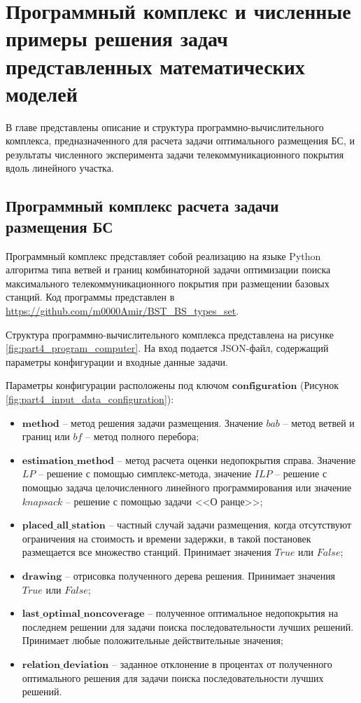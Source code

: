 \chapter{Программный комплекс и численные примеры решения задач представленных математических моделей}\label{part4}

В главе представлены описание и структура программно-вычислительного комплекса, предназначенного для расчета задачи оптимального размещения БС, и результаты численного эксперимента задачи телекоммуникационного покрытия вдоль линейного участка.

\section{Программный комплекс расчета задачи размещения БС}

Программный комплекс \cite{progbib_mukhtarpov} представляет собой реализацию на языке Python алгоритма типа ветвей и границ комбинаторной задачи оптимизации поиска максимального телекоммуникационного покрытия при размещении базовых станций. Код программы представлен в \url{https://github.com/m0000Amir/BST_BS_types_set}.

Структура программно-вычислительного комплекса представлена на рисунке \ref{fig:part4_program_computer}. На вход подается JSON-файл, содержащий параметры конфигурации и входные данные задачи.

 Параметры конфигурации расположены под ключом $\textbf{configuration}$ (Рисунок \cref{fig:part4_input_data_configuration}):
 \begin{itemize}
   \item $\textbf{method}$ -- метод решения задачи размещения. Значение $\textit{bab}$ -- метод ветвей и границ или $\textit{bf}$  -- метод полного перебора;
   \item $\textbf{estimation\_method}$ -- метод расчета оценки недопокрытия справа. Значение $\textit{LP}$ -- решение с помощью симплекс-метода, значение $\textit{ILP}$ -- решение с помощью задача целочисленного линейного программирования или значение $\textit{knapsack}$ -- решение с помощью задачи <<О ранце>>;
   \item $\textbf{placed\_all\_station}$ -- частный случай задачи размещения, когда отсутствуют ограничения на стоимость и времени задержки, в такой постановек размещается все множество станций. Принимает значения $\textit{True}$ или $\textit{False}$;
   \item $\textbf{drawing}$ -- отрисовка полученного дерева решения.  Принимает значения $\textit{True}$ или $\textit{False}$;
   \item $\textbf{last\_optimal\_noncoverage}$ -- полученное оптимальное недопокрытия на последнем решении  для задачи поиска последовательности лучших решений. Принимает любые положительные действительные значения;
   \item $\textbf{relation\_deviation}$ -- заданное отклонение в процентах от полученного оптимального решения для задачи поиска последовательности лучших решений.
 \end{itemize}



